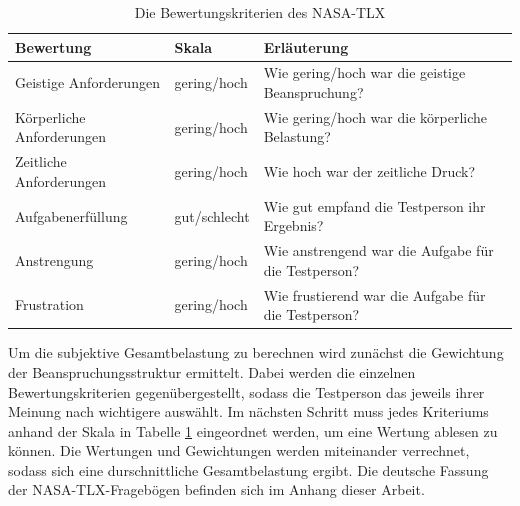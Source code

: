 \begin{center}
\begin{table}[h!]
    \begin{tabular}{ | l | l | p{6cm} |}
    \hline
	\rule{0pt}{4ex} 
	\textbf{Bewertung} & \textbf{Skala} & \textbf{Erläuterung} \\ \hline 
	\rule{0pt}{4ex} 
    Geistige Anforderungen & gering/hoch & Wie gering/hoch war die geistige Beanspruchung? \\ \hline 
	\rule{0pt}{4ex} 
    Körperliche Anforderungen & gering/hoch & Wie gering/hoch war die körperliche Belastung?  \\ \hline
	\rule{0pt}{4ex} 
    Zeitliche Anforderungen & gering/hoch & Wie hoch war der zeitliche Druck? \\ \hline
	\rule{0pt}{4ex} 
    Aufgabenerfüllung & gut/schlecht & Wie gut empfand die Testperson ihr Ergebnis? \\ \hline
	\rule{0pt}{4ex} 
	Anstrengung & gering/hoch & Wie anstrengend war die Aufgabe für die Testperson? \\ \hline
	\rule{0pt}{4ex} 
	Frustration & gering/hoch & Wie frustierend war die Aufgabe für die Testperson? \\ \hline

	\end{tabular}
\caption{Die Bewertungskriterien des \acs{NASA-TLX}}
\label{table:nasatlx}
\end{table}
\end{center}

\pagebreak
Um die subjektive Gesamtbelastung zu berechnen wird zunächst die Gewichtung der Beanspruchungsstruktur ermittelt.
Dabei werden die einzelnen Bewertungskriterien gegenübergestellt, sodass die Testperson das jeweils ihrer Meinung nach wichtigere auswählt.
Im nächsten Schritt muss jedes Kriteriums anhand der Skala in Tabelle \ref{table:nasatlx} eingeordnet werden, um eine Wertung ablesen zu können.
Die Wertungen und Gewichtungen werden miteinander verrechnet, sodass sich eine durschnittliche Gesamtbelastung ergibt.
Die deutsche Fassung der \acs{NASA-TLX}-Fragebögen \cite{seifert02} befinden sich im Anhang dieser Arbeit.\\









